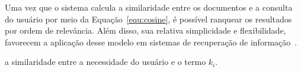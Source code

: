 
Uma vez que o sistema calcula a similaridade entre os documentos e a consulta do usuário por meio da Equação~\ref{equ:cosine}, é possível ranquear os resultados por ordem de relevância. Além disso, sua relativa simplicidade e flexibilidade, favorecem a aplicação desse modelo em sistemas de recuperação de informação~\cite{Tan2005,Croft2009,Manning2008}.


















































a similaridade entre a necessidade do usuário e o termo $k_i$. 
















